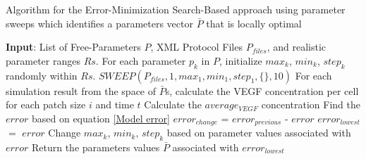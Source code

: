 \begin{algorithm}
\caption{Algorithm for the Error-Minimization Search-Based approach using parameter sweeps which identifies a parameters vector $\bar{P}$ that is locally optimal}
\label{optimization_Algo}
\begin{algorithmic}[1]

\State \textbf{Input}: List of Free-Parameters $P$, XML Protocol Files $P_{files}$, and realistic parameter ranges $Rs$.
\State For each parameter $p_k$ in $P$, initialize  $max_k$, $min_k$, $step_k$ randomly within $Rs$.
\State$SWEEP(P_{files}, 1, max_1, min_1, step_1, \{\}, 10)$ 
\State For each simulation result from the space of $\bar{P}$s, calculate the VEGF concentration per cell for each patch size $i$ and time $t$
\State Calculate the $average_{VEGF}$ concentration
\State Find the $error$ based on equation \ref{Model error}
\State $error_{change}$ = $error_{previous}$ - $error$
\State $error_{lowest}$ $=$ $error$
\State Change $max_k$, $min_k$, $step_k$ based on parameter values associated with $error$
\EndIf
\EndWhile
\State Return the parameters values $\bar{P}$ associated with $error_{lowest}$  

\end{algorithmic}
\end{algorithm}





